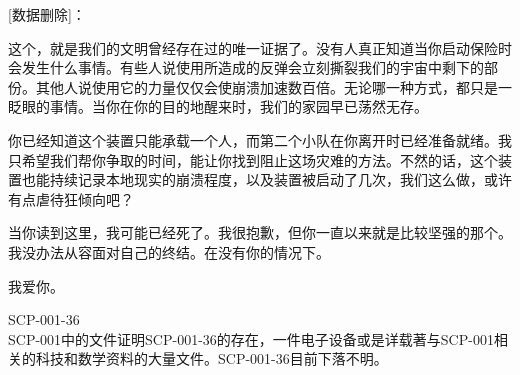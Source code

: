 \begin{scpbox}

[数据删除]：

这个，就是我们的文明曾经存在过的唯一证据了。没有人真正知道当你启动保险时会发生什么事情。有些人说使用所造成的反弹会立刻撕裂我们的宇宙中剩下的部份。其他人说使用它的力量仅仅会使崩溃加速数百倍。无论哪一种方式，都只是一眨眼的事情。当你在你的目的地醒来时，我们的家园早已荡然无存。

你已经知道这个装置只能承载一个人，而第二个小队在你离开时已经准备就绪。我只希望我们帮你争取的时间，能让你找到阻止这场灾难的方法。不然的话，这个装置也能持续记录本地现实的崩溃程度，以及装置被启动了几次，我们这么做，或许有点虐待狂倾向吧？

当你读到这里，我可能已经死了。我很抱歉，但你一直以来就是比较坚强的那个。我没办法从容面对自己的终结。在没有你的情况下。

我爱你。

\end{scpbox}

SCP-001-36 \\
SCP-001中的文件证明SCP-001-36的存在，一件电子设备或是详载著与SCP-001相关的科技和数学资料的大量文件。SCP-001-36目前下落不明。
